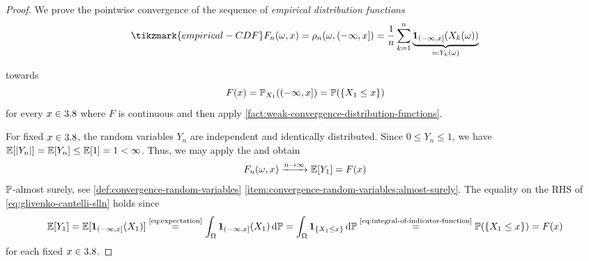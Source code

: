 \begin{proof}
We prove the pointwise convergence of the sequence of \emph{empirical distribution functions}
\[
\tikzmark{empirical-CDF}%
F_n(\omega,x)
=
\rho_n(\omega,(-\infty,x])
=
\frac{1}{n}\sum_{k=1}^n
\underbrace{\ind_{(-\infty,x]}(X_k(\omega))}_{\eqqcolon Y_k(\omega)}
\]
\tikzexternaldisable%
%
\tikzexternalenable%
towards
\[
F(x)
=
\mathbb{P}_{X_1}((-\infty,x])
=
\mathbb{P}(\{X_1\leq x\})
\]
for every \(x\in3.8\) where \(F\) is continuous and then apply \autoref{fact:weak-convergence-distribution-functions}.

For fixed \(x\in3.8\), the random variables \(Y_n\) are independent and identically distributed.
Since \(0 \allowbreak \leq \allowbreak Y_n \allowbreak \leq \allowbreak 1\), we have \(\operatorname{\mathbb{E}}[|Y_n|] = \operatorname{\mathbb{E}}[Y_n] \leq \operatorname{\mathbb{E}}[1] = 1 < \infty\).
Thus, we may apply the  and obtain
\begin{equation}\label{eq:glivenko-cantelli-slln}
F_n(\omega,x)
\xrightarrow{n\to\infty}
\operatorname{\mathbb{E}}[Y_1]
=
F(x)
\end{equation}
$\mathbb{P}$-almost surely, see \autoref{def:convergence-random-variables} \ref{item:convergence-random-variables:almost-surely}.
The equality on the RHS of \eqref{eq:glivenko-cantelli-slln} holds since
\[
\operatorname{\mathbb{E}}[Y_1]
=
\operatorname{\mathbb{E}}[\mathbf{1}_{(-\infty,x]}(X_1)]
\overset{\text{\eqref{eq:expectation}}}{=}
\int_\Omega \mathbf{1}_{(-\infty,x]}(X_1)\,\mathrm{d}\mathbb{P}
=
\int_\Omega \mathbf{1}_{\{X_1 \leq x\}}\,\mathrm{d}\mathbb{P}
\overset{\text{\eqref{eq:integral-of-indicator-function}}}{=} 
\mathbb{P}(\{X_1\leq x\})
=
F(x)
\]
for each fixed \(x\in3.8\).


\end{proof}
